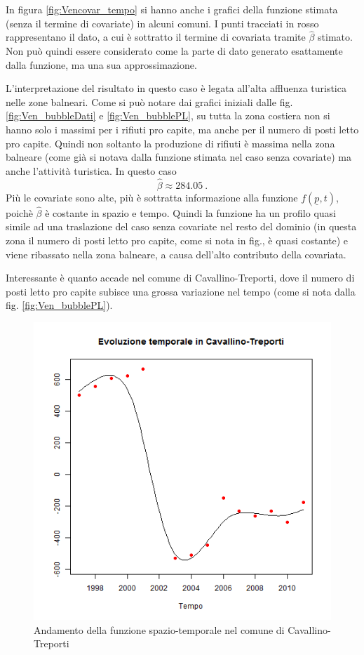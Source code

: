 \documentclass[a4paper,11pt,twoside,openright]{book}							%
\begin{document}
In figura \ref{fig:Vencovar_tempo} si hanno anche i grafici della funzione stimata (senza il termine di covariate) in alcuni comuni. I punti tracciati in rosso rappresentano il dato, a cui è sottratto il termine di covariata tramite $\hat{\beta}$ stimato. Non può quindi essere considerato come la parte di dato generato esattamente dalla funzione, ma una sua approssimazione.

L'interpretazione del risultato in questo caso è legata all'alta affluenza turistica nelle zone balneari. Come si può notare dai grafici iniziali dalle fig. \ref{fig:Ven_bubbleDati} e \ref{fig:Ven_bubblePL}, su tutta la zona costiera non si hanno solo i massimi per i rifiuti pro capite, ma anche per il numero di posti letto pro capite. Quindi non soltanto la produzione di rifiuti è massima nella zona balneare (come già si notava dalla funzione stimata nel caso senza covariate) ma anche l'attività turistica. In questo caso
$$
\hat{\beta}\approx284.05 \ .
$$
Più le covariate sono alte, più è sottratta informazione alla funzione $f(\underline p,t)$, poichè $\hat{\beta}$ è costante in spazio e tempo. Quindi la funzione ha un profilo quasi simile ad una traslazione del caso senza covariate nel resto del dominio (in questa zona il numero di posti letto pro capite, come si nota in fig., è quasi costante) e viene ribassato nella zona balneare, a causa dell'alto contributo della covariata.

Interessante è quanto accade nel comune di Cavallino-Treporti, dove il numero di posti letto pro capite subisce una grossa variazione nel tempo (come si nota dalla fig. \ref{fig:Ven_bubblePL}). 

\begin{figure}[h]
\centering
\includegraphics[width=\textwidth]{Immagini/venezia_con_covariate/Cavallino-Treporti.png}
\caption{Andamento della funzione spazio-temporale nel comune di Cavallino-Treporti}
\label{fig:Ven_CTcovar}
\end{figure}
\end{document}
